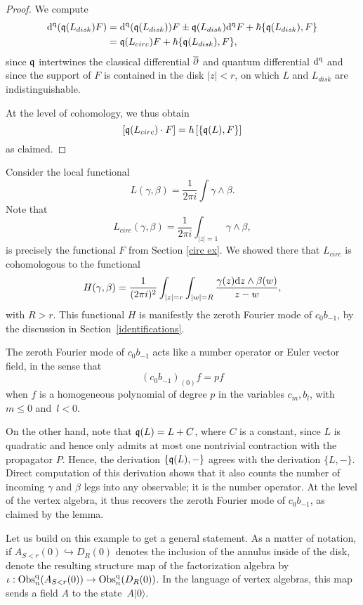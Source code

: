 \begin{proof}
We compute
\begin{align*}
{\rm d}^{\rm q}(\frak{q}(L_{disk}) F) &= {\rm d}^{\rm q}(\frak{q}(L_{disk})) F \pm \frak{q}(L_{disk}) {\rm d}^{\rm q} F+ \hbar \{\frak{q}(L_{disk}),F\} \\
&=\frak{q}(L_{circ})F +\hbar \{\frak{q}(L_{disk}),F\},
\end{align*}
since $\frak{q}$ intertwines the classical differential $\overline{\partial} $ and quantum differential ${\rm d}^{\rm q}$ and
since the support of $F$ is contained in the disk $|z| < r$, 
on which $L$ and $L_{disk}$ are indistinguishable.

At the level of cohomology, we thus obtain
\[
[\frak{q}(L_{circ}) \cdot F] =\hbar \left[ \{\frak{q}(L) , F\} \right] 
\]
as claimed.
\end{proof}

\begin{ex} Consider the local functional
\[
L(\gamma,\beta) = \frac{1}{2\pi i}\int \gamma \wedge \beta. 
\]
Note that
\[
L_{circ} (\gamma,\beta) = \frac{1}{2\pi i}\int_{|z|=1} \gamma \wedge \beta,
\]
is precisely the functional $F$ from Section \ref{circ ex}.
We showed there that $L_{circ}$ is cohomologous to the functional
\[
H(\gamma,\beta) = \frac{1}{(2\pi i)^2} \int_{|z| = r} \int_{|w| = R} \frac{\gamma(z) {\rm d} z \wedge \beta(w)}{z-w},
\]
with $R > r$.
This functional $H$ is manifestly the zeroth Fourier mode of $c_0 b_{-1}$,
by the discussion in Section~\ref{identifications}.

The zeroth Fourier mode of $c_0 b_{-1}$ acts like a number operator or Euler vector field, in the sense that 
\[
(c_0 b_{-1})_{(0)} f = p f 
\]
when $f$ is a homogeneous polynomial of degree $p$ in the variables $c_{m},b_{l}$, with $m \leq 0$ and~$l < 0$.

On the other hand, note that $\frak{q}(L) = L + C$, where $C$ is a constant, since $L$ is quadratic and hence only admits at most one nontrivial contraction with the propagator $P$. Hence, the derivation $\{\frak{q}(L), -\}$ agrees with the derivation $\{L, -\}$.
Direct computation of this derivation shows that it also counts the number of incoming $\gamma$ and $\beta$ legs into any observable; it is the number operator. At the level of the vertex algebra, it thus recovers the zeroth Fourier mode of $c_0 b_{-1}$,
as claimed by the lemma.
\end{ex}

Let us build on this example to get a general statement.
As a matter of notation, if $A_{S<r}(0) \hookrightarrow D_R(0)$ denotes the inclusion of the annulus inside of the disk, 
denote the resulting structure map of the factorization algebra by $\iota : {\rm Obs}^{{\rm q}}_n(A_{S<r}(0)) \to {\rm Obs}^{{\rm q}}_n(D_R(0))$. 
In the language of vertex algebras, this map sends a field $A$ to the state~$A |0\rangle$.

